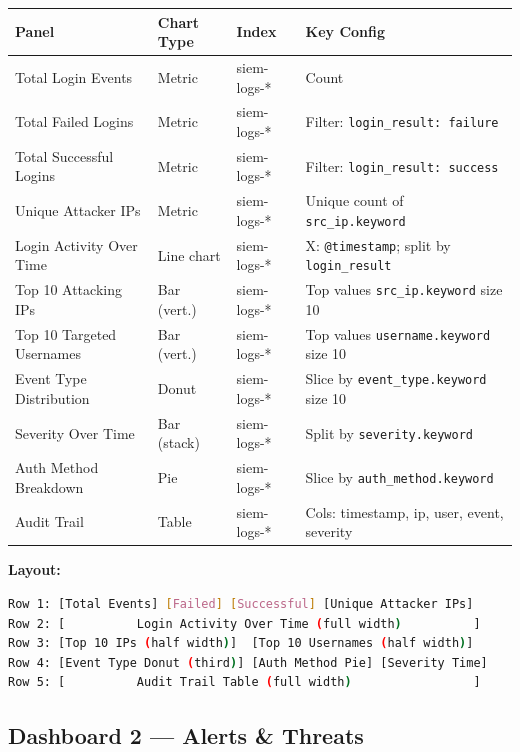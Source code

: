 \documentclass[12pt,a4paper]{article}
\newcommand{\field}[1]{\texttt{#1}}
\begin{document}
\begin{center}
\begin{tabular}{p{4cm}p{2.5cm}p{2cm}p{4.5cm}}
  \toprule
  \textbf{Panel} & \textbf{Chart Type} & \textbf{Index} & \textbf{Key Config} \\
  \midrule
  Total Login Events       & Metric      & siem-logs-* & Count \\
  Total Failed Logins      & Metric      & siem-logs-* & Filter: \field{login\_result: failure} \\
  Total Successful Logins  & Metric      & siem-logs-* & Filter: \field{login\_result: success} \\
  Unique Attacker IPs      & Metric      & siem-logs-* & Unique count of \field{src\_ip.keyword} \\
  Login Activity Over Time & Line chart  & siem-logs-* & X: \field{@timestamp}; split by \field{login\_result} \\
  Top 10 Attacking IPs     & Bar (vert.) & siem-logs-* & Top values \field{src\_ip.keyword} size 10 \\
  Top 10 Targeted Usernames& Bar (vert.) & siem-logs-* & Top values \field{username.keyword} size 10 \\
  Event Type Distribution  & Donut       & siem-logs-* & Slice by \field{event\_type.keyword} size 10 \\
  Severity Over Time       & Bar (stack) & siem-logs-* & Split by \field{severity.keyword} \\
  Auth Method Breakdown    & Pie         & siem-logs-* & Slice by \field{auth\_method.keyword} \\
  Audit Trail              & Table       & siem-logs-* & Cols: timestamp, ip, user, event, severity \\
  \bottomrule
\end{tabular}
\end{center}

\textbf{Layout:}
\begin{lstlisting}[language=bash]
Row 1: [Total Events] [Failed] [Successful] [Unique Attacker IPs]
Row 2: [          Login Activity Over Time (full width)          ]
Row 3: [Top 10 IPs (half width)]  [Top 10 Usernames (half width)]
Row 4: [Event Type Donut (third)] [Auth Method Pie] [Severity Time]
Row 5: [          Audit Trail Table (full width)                 ]
\end{lstlisting}

\subsection{Dashboard 2 — Alerts \& Threats}
\end{document}

